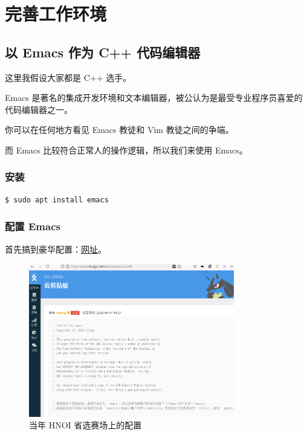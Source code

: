 \documentclass[UTF-8]{ctexart}
\begin{document}
	\section{完善工作环境}
	
		\subsection{以 Emacs 作为 C++ 代码编辑器}
		
			这里我假设大家都是 C++ 选手。
			
			Emacs 是著名的集成开发环境和文本编辑器，被公认为是最受专业程序员喜爱的代码编辑器之一。
			
			你可以在任何地方看见 Emacs 教徒和 Vim 教徒之间的争端。
			
			而 Emacs 比较符合正常人的操作逻辑，所以我们来使用 Emacs。
		
			\subsubsection{安装}
		
				\begin{verbatim}
$ sudo apt install emacs
				\end{verbatim}
			
			\subsubsection{配置 Emacs}
			
				首先搞到豪华配置：\href{https://www.luogu.com.cn/paste/uzsz2zf4}{网址}。
				
				\begin{figure}[H]
					\centering
					\includegraphics[width=0.8\textwidth]{fig/emacs_init_el.png}
					\caption*{当年 HNOI 省选赛场上的配置}
				\end{figure}
			
\end{document}
